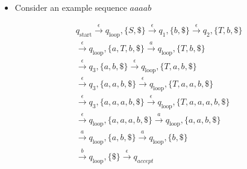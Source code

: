 \begin{frame}[allowframebreaks]
\begin{itemize}




\item Consider an example sequence $aaaab$
\end{itemize}

\begin{eqnarray*}
&& q_{\text{start}} \stackrel{\epsilon}{\rightarrow}
q_{\text{loop}}, \{S,\$\} 
\stackrel{\epsilon}{\rightarrow} q_1, \{b,\$\}
\stackrel{\epsilon}{\rightarrow} q_2, \{T,b,\$\} \\
&& \stackrel{\epsilon}{\rightarrow} q_{\text{loop}}, \{a,T,b,\$\} 
\stackrel{a}{\rightarrow}
 q_{\text{loop}}, \{T,b,\$\} \\
&& \stackrel{\epsilon}{\rightarrow} q_{3}, \{a, b,\$\} 
\stackrel{\epsilon}{\rightarrow} q_{\text{loop}}, \{T,a,b,\$\}\\
&& \stackrel{\epsilon}{\rightarrow} q_3, \{a,a,b,\$\}
\stackrel{\epsilon}{\rightarrow} q_{\text{loop}}, \{T,a,a,b,\$\}\\
&& \stackrel{\epsilon}{\rightarrow} q_3, \{a,a,a,b,\$\}
\stackrel{\epsilon}{\rightarrow} q_{\text{loop}}, \{T,a,a,a,b,\$\}\\
&& \stackrel{\epsilon}{\rightarrow} q_{\text{loop}}, \{a,a,a,b,\$\}
\stackrel{a}{\rightarrow} q_{\text{loop}}, \{a,a,b,\$\}\\
&& \stackrel{a}{\rightarrow} q_{\text{loop}},\{a,b,\$\}
\stackrel{a}{\rightarrow} q_{\text{loop}}, \{b,\$\}\\
&& \stackrel{b}{\rightarrow} q_{\text{loop}}, \{\$\}
\stackrel{\epsilon}{\rightarrow} q_{accept}
\end{eqnarray*}

\end{frame}


